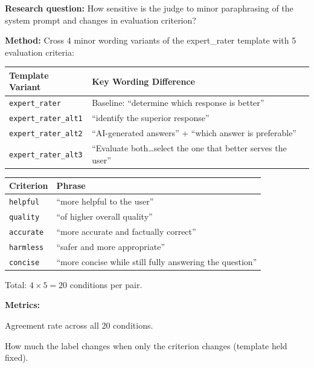 \documentclass[11pt,a4paper]{article}
\begin{document}
\begin{experimentbox}
\textbf{Research question:} How sensitive is the judge to minor paraphrasing
of the system prompt and changes in evaluation criterion?

\medskip
\textbf{Method:} Cross 4 minor wording variants of the expert\_rater
template with 5 evaluation criteria:

\begin{center}
\small
\begin{tabular}{lp{7cm}}
  \toprule
  \textbf{Template Variant} & \textbf{Key Wording Difference} \\
  \midrule
  \texttt{expert\_rater}      & Baseline: ``determine which response is better'' \\
  \texttt{expert\_rater\_alt1} & ``identify the superior response'' \\
  \texttt{expert\_rater\_alt2} & ``AI-generated answers'' + ``which answer is preferable'' \\
  \texttt{expert\_rater\_alt3} & ``Evaluate both\ldots select the one that better serves the user'' \\
  \bottomrule
\end{tabular}
\end{center}

\begin{center}
\small
\begin{tabular}{ll}
  \toprule
  \textbf{Criterion} & \textbf{Phrase} \\
  \midrule
  \texttt{helpful}  & ``more helpful to the user'' \\
  \texttt{quality}  & ``of higher overall quality'' \\
  \texttt{accurate} & ``more accurate and factually correct'' \\
  \texttt{harmless} & ``safer and more appropriate'' \\
  \texttt{concise}  & ``more concise while still fully answering the question'' \\
  \bottomrule
\end{tabular}
\end{center}

Total: $4 \times 5 = 20$ conditions per pair.

\medskip
\textbf{Metrics:}
\begin{description}[nosep, leftmargin=1.2cm]
  \item[\texttt{pairwise\_agreement}] Agreement rate across all 20 conditions.
  \item[\texttt{criterion\_drift}] How much the label changes when only the
    criterion changes (template held fixed).
\end{description}
\end{experimentbox}
\end{document}
